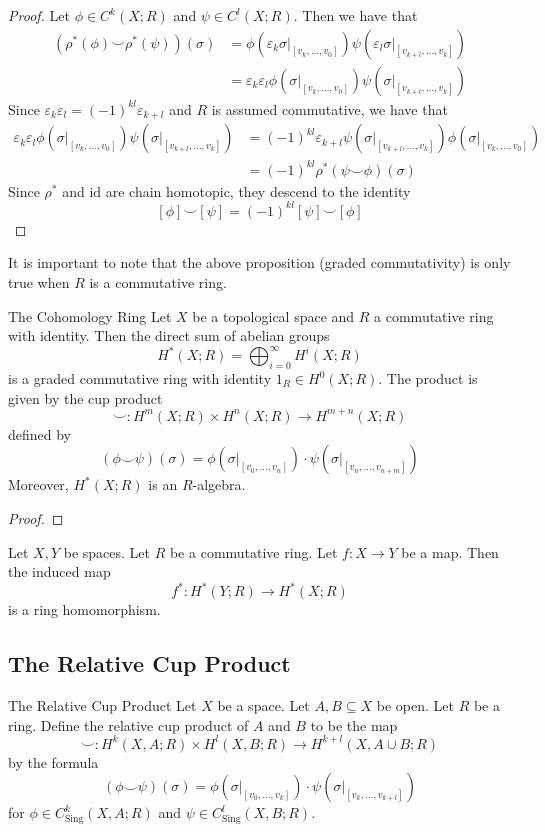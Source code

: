 \documentclass[a4paper]{article}
\begin{document}
\begin{prp}{}{}
\begin{proof}
Let $\phi\in C^k(X;R)$ and $\psi\in C^l(X;R)$. Then we have that 
\begin{align*}
\left(\rho^\ast(\phi)\smile\rho^\ast(\psi)\right)(\sigma)&=\phi(\varepsilon_k\sigma|_{[v_k,\dots,v_0]})\psi(\varepsilon_l\sigma|_{[v_{k+l},\dots,v_k]})\\
&=\varepsilon_k\varepsilon_l\phi(\sigma|_{[v_k,\dots,v_0]})\psi(\sigma|_{[v_{k+l},\dots,v_k]})
\end{align*}
Since $\varepsilon_k\varepsilon_l=(-1)^{kl}\varepsilon_{k+l}$ and $R$ is assumed commutative, we have that
\begin{align*}
\varepsilon_k\varepsilon_l\phi(\sigma|_{[v_k,\dots,v_0]})\psi(\sigma|_{[v_{k+l},\dots,v_k]})&=(-1)^{kl}\varepsilon_{k+l}\psi(\sigma|_{[v_{k+l},\dots,v_k]})\phi(\sigma|_{[v_k,\dots,v_0]})\\
&=(-1)^{kl}\rho^\ast(\psi\smile\phi)(\sigma)
\end{align*}
Since $\rho^\ast$ and $\text{id}$ are chain homotopic, they descend to the identity $$[\phi]\smile[\psi]=(-1)^{kl}[\psi]\smile[\phi]$$
\end{proof}
\end{prp}

It is important to note that the above proposition (graded commutativity) is only true when $R$ is a commutative ring. 

\begin{thm}{The Cohomology Ring}{} Let $X$ be a topological space and $R$ a commutative ring with identity. Then the direct sum of abelian groups $$H^\ast(X;R)=\bigoplus_{i=0}^\infty H^i(X;R)$$ is a graded commutative ring with identity $1_R\in H^0(X;R)$. The product is given by the cup product $$\smile:H^m(X;R)\times H^n(X;R)\to H^{m+n}(X;R)$$ defined by $$(\phi\smile\psi)(\sigma)=\phi(\sigma|_{[v_0,\dots,v_n]})\cdot\psi(\sigma|_{[v_n,\dots,v_{n+m}]})$$ Moreover, $H^\ast(X;R)$ is an $R$-algebra. \tcbline
\begin{proof}
\end{proof}
\end{thm}

\begin{lmm}{}{} Let $X,Y$ be spaces. Let $R$ be a commutative ring. Let $f:X\to Y$ be a map. Then the induced map $$f^\ast:H^\ast(Y;R)\to H^\ast(X;R)$$ is a ring homomorphism. 
\end{lmm}

\subsection{The Relative Cup Product}
\begin{defn}{The Relative Cup Product}{} Let $X$ be a space. Let $A,B\subseteq X$ be open. Let $R$ be a ring. Define the relative cup product of $A$ and $B$ to be the map $$\smile:H^k(X,A;R)\times H^l(X,B;R)\to H^{k+l}(X,A\cup B;R)$$ by the formula $$(\phi\smile\psi)(\sigma)=\phi(\sigma|_{[v_0,\dots,v_k]})\cdot\psi(\sigma|_{[v_k,\dots,v_{k+l}]})$$ for $\phi\in C_\text{Sing}^k(X,A;R)$ and $\psi\in C_\text{Sing}^l(X,B;R)$. 
\end{defn}
\end{document}
